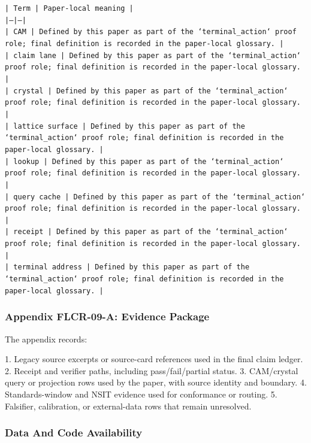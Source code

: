 \documentclass[11pt]{article}
\begin{document}
\noindent\texttt{| Term | Paper-local meaning |}\\
\noindent\texttt{|---|---|}\\
\noindent\texttt{| CAM | Defined by this paper as part of the `terminal\_action` proof role; final definition is recorded in the paper-local glossary. |}\\
\noindent\texttt{| claim lane | Defined by this paper as part of the `terminal\_action` proof role; final definition is recorded in the paper-local glossary. |}\\
\noindent\texttt{| crystal | Defined by this paper as part of the `terminal\_action` proof role; final definition is recorded in the paper-local glossary. |}\\
\noindent\texttt{| lattice surface | Defined by this paper as part of the `terminal\_action` proof role; final definition is recorded in the paper-local glossary. |}\\
\noindent\texttt{| lookup | Defined by this paper as part of the `terminal\_action` proof role; final definition is recorded in the paper-local glossary. |}\\
\noindent\texttt{| query cache | Defined by this paper as part of the `terminal\_action` proof role; final definition is recorded in the paper-local glossary. |}\\
\noindent\texttt{| receipt | Defined by this paper as part of the `terminal\_action` proof role; final definition is recorded in the paper-local glossary. |}\\
\noindent\texttt{| terminal address | Defined by this paper as part of the `terminal\_action` proof role; final definition is recorded in the paper-local glossary. |}\\

\subsubsection*{Appendix FLCR-09-A: Evidence Package}

The appendix records:

1. Legacy source excerpts or source-card references used in the final claim ledger.
2. Receipt and verifier paths, including pass/fail/partial status.
3. CAM/crystal query or projection rows used by the paper, with source identity and boundary.
4. Standards-window and NSIT evidence used for conformance or routing.
5. Falsifier, calibration, or external-data rows that remain unresolved.

\subsubsection*{Data And Code Availability}
\end{document}
